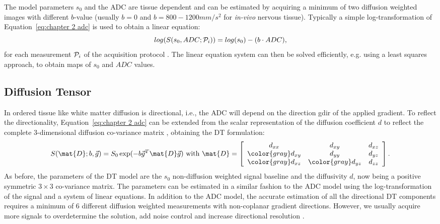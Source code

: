 The model parameters $s_0$ and the \gls{ADC} are tissue dependent and can be estimated by acquiring a minimum of two diffusion weighted images with different $b$-value (usually $b=0$ and $b=800-1200mm/s^2$ for \emph{in-vivo} nervous tissue). Typically a simple log-transformation of Equation~\ref{eq:chapter 2 adc} is used to obtain a linear equation:
\begin{equation}
	log(S(s_0,ADC;\mathcal{P}_i)) = log(s_{0}) - (b\cdot ADC),
    \label{eq:chapter 2 adc}
\end{equation}
for each measurement $\mathcal{P}_i$ of the acquisition protocol \prot{}. The linear equation system can then be solved efficiently, e.g. using a least squares approach, to obtain maps of $s_0$ and $ADC$ values.

\subsection{Diffusion Tensor}
\label{subsec:dti}
In ordered tissue like white matter diffusion is directional, i.e., the \gls{ADC} will depend on the direction {\gls{gdir}} of the applied gradient. To reflect the directionality, Equation~\ref{eq:chapter 2 adc} can be extended from the scalar representation of the diffusion coefficient $d$ to reflect the complete 3-dimensional diffusion co-variance matrix \citep{Basser:1994}, obtaining the {\gls{DT}} formulation:
\begin{equation}
	S(\mat{D};b,\vec{g}) = S_{0}\exp(-b\vec{g}^T \mat{D}\vec{g}) \mbox{ with } \mat{D} = 
	\left[
	\begin{array}{ccc}
	d_{xx} & d_{xy} & d_{xz} \\
	{\color{gray} d_{xy}} & d_{yy} & d_{yz} \\
	{\color{gray} d_{xz}} & {\color{gray} d_{yz}} & d_{zz} 	
	\end{array} \right].	
    \label{eq:dti}
\end{equation}
As before, the parameters of the {\gls{DT}} model are the $s_0$ non-diffusion weighted signal baseline and the diffusivity $d$, now being a positive symmetric $3\times3$ co-variance matrix. The parameters can be estimated in a similar fashion to the ADC model using the log-transformation of the signal and a system of linear equations. In addition to the ADC model, the accurate estimation of all the directional {\gls{DT}} components requires a minimum of 6 different diffusion weighted measurements with non-coplanar gradient directions. However, we usually acquire more signals to overdetermine the solution, add noise control and increase directional resolution \citep{Jones:2004a}.



